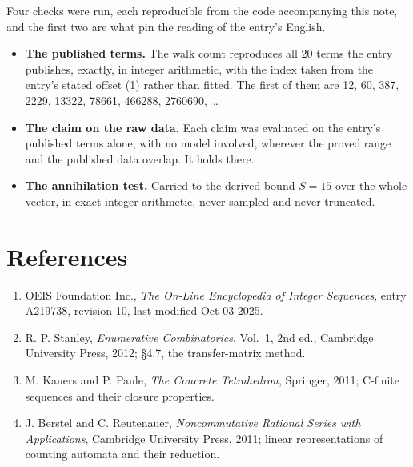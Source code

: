 \documentclass[11pt]{article}
\theoremstyle{definition}
\begin{document}
Four checks were run, each reproducible from the code accompanying this note, and the first two are what pin the reading of the entry's English.

\begin{itemize}

\item {\bfseries The published terms.} The walk count reproduces all 20 terms the entry publishes, exactly, in integer arithmetic, with the index taken from the entry's stated offset (1) rather than fitted. The first of them are 12, 60, 387, 2229, 13322, 78661, 466288, 2760690,~\dots

\item {\bfseries The claim on the raw data.} Each claim was evaluated on the entry's published terms alone, with no model involved, wherever the proved range and the published data overlap. It holds there.

\item {\bfseries The annihilation test.} Carried to the derived bound $S = 15$ over the whole vector, in exact integer arithmetic, never sampled and never truncated.

\end{itemize}

\section{References}

\begin{enumerate}

\item OEIS Foundation Inc., \emph{The On-Line Encyclopedia of Integer Sequences}, entry \href{https://oeis.org/A219738}{A219738}, revision 10, last modified Oct 03 2025.

\item R. P. Stanley, \emph{Enumerative Combinatorics}, Vol.~1, 2nd ed., Cambridge University Press, 2012; \S4.7, the transfer-matrix method.

\item M. Kauers and P. Paule, \emph{The Concrete Tetrahedron}, Springer, 2011; C-finite sequences and their closure properties.

\item J. Berstel and C. Reutenauer, \emph{Noncommutative Rational Series with Applications}, Cambridge University Press, 2011; linear representations of counting automata and their reduction.

\end{enumerate}
\end{document}
